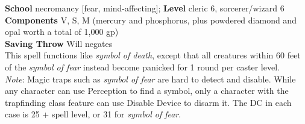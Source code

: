 \textbf{School} necromancy [fear, mind-affecting]; \textbf{Level} cleric 6, sorcerer/wizard 6\\
\textbf{Components} V, S, M (mercury and phosphorus, plus powdered diamond and opal worth a total of 1,000 gp)\\
\textbf{Saving Throw }Will negates\\
This spell functions like \textit{symbol of death}, except that all creatures within 60 feet of the \textit{symbol of fear }instead become panicked for 1 round per caster level.\\
\textit{Note}: Magic traps such as \textit{symbol of fear }are hard to detect and disable. While any character can use Perception to find a symbol, only a character with the trapfinding class feature can use Disable Device to disarm it. The DC in each case is 25 + spell level, or 31 for \textit{symbol of fear}.\\
